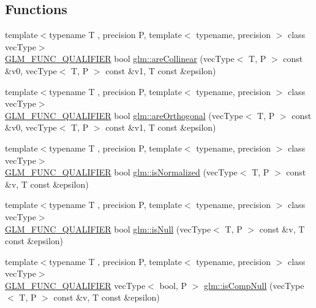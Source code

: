 \subsection*{Functions}
\begin{DoxyCompactItemize}
\item 
{\footnotesize template$<$typename T , precision P, template$<$ typename, precision $>$ class vec\+Type$>$ }\\\hyperlink{setup_8hpp_a33fdea6f91c5f834105f7415e2a64407}{G\+L\+M\+\_\+\+F\+U\+N\+C\+\_\+\+Q\+U\+A\+L\+I\+F\+I\+ER} bool \hyperlink{group__gtx__vector__query_ga465b844190d1740051e45d780832ea4c}{glm\+::are\+Collinear} (vec\+Type$<$ T, P $>$ const \&v0, vec\+Type$<$ T, P $>$ const \&v1, T const \&epsilon)
\item 
{\footnotesize template$<$typename T , precision P, template$<$ typename, precision $>$ class vec\+Type$>$ }\\\hyperlink{setup_8hpp_a33fdea6f91c5f834105f7415e2a64407}{G\+L\+M\+\_\+\+F\+U\+N\+C\+\_\+\+Q\+U\+A\+L\+I\+F\+I\+ER} bool \hyperlink{group__gtx__vector__query_gaee10acefed397c11e01f2862e837754c}{glm\+::are\+Orthogonal} (vec\+Type$<$ T, P $>$ const \&v0, vec\+Type$<$ T, P $>$ const \&v1, T const \&epsilon)
\item 
{\footnotesize template$<$typename T , precision P, template$<$ typename, precision $>$ class vec\+Type$>$ }\\\hyperlink{setup_8hpp_a33fdea6f91c5f834105f7415e2a64407}{G\+L\+M\+\_\+\+F\+U\+N\+C\+\_\+\+Q\+U\+A\+L\+I\+F\+I\+ER} bool \hyperlink{group__gtx__vector__query_ga6fa5fa2af67d14c205d24c49aad03270}{glm\+::is\+Normalized} (vec\+Type$<$ T, P $>$ const \&v, T const \&epsilon)
\item 
{\footnotesize template$<$typename T , precision P, template$<$ typename, precision $>$ class vec\+Type$>$ }\\\hyperlink{setup_8hpp_a33fdea6f91c5f834105f7415e2a64407}{G\+L\+M\+\_\+\+F\+U\+N\+C\+\_\+\+Q\+U\+A\+L\+I\+F\+I\+ER} bool \hyperlink{group__gtx__vector__query_ga81a64edc1a2b470b82896592e89c523b}{glm\+::is\+Null} (vec\+Type$<$ T, P $>$ const \&v, T const \&epsilon)
\item 
{\footnotesize template$<$typename T , precision P, template$<$ typename, precision $>$ class vec\+Type$>$ }\\\hyperlink{setup_8hpp_a33fdea6f91c5f834105f7415e2a64407}{G\+L\+M\+\_\+\+F\+U\+N\+C\+\_\+\+Q\+U\+A\+L\+I\+F\+I\+ER} vec\+Type$<$ bool, P $>$ \hyperlink{group__gtx__vector__query_ga93ecd4137480483ce1af0de8bbbf6546}{glm\+::is\+Comp\+Null} (vec\+Type$<$ T, P $>$ const \&v, T const \&epsilon)

\end{DoxyCompactItemize}
